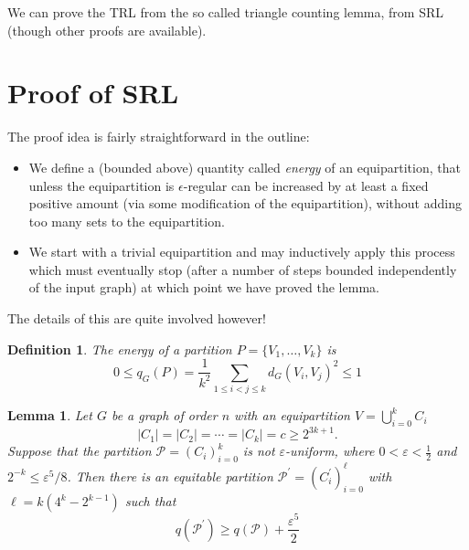 \documentclass[oneside,12pt,]{article}
\newtheorem{lemma}[theorem]{Lemma}
\newtheorem{definition}[theorem]{Definition}
\begin{document}

We can prove the TRL from the so called triangle counting lemma, from SRL (though other proofs are available).

\section{Proof of SRL}
The proof idea is fairly straightforward in the outline:

\begin{itemize}
    \item We define a (bounded above) quantity called \emph{energy} of an equipartition, that unless the equipartition is $\epsilon $-regular can be increased by at least a fixed positive amount (via some modification of the equipartition), without adding too many sets to the equipartition.

    \item We start with a trivial equipartition and may inductively apply this process which must eventually stop (after a number of steps bounded independently of the input graph) at which point we have proved the lemma.
\end{itemize}


The details of this are quite involved however!

\begin{definition}
    The \emph{energy} of a partition $P= \{V_1, \ldots, V_k\}$ is
    $$0 \le q_G(P)=\frac{1}{k^2} \sum_{1 \leq i<j \leq k} d_G\left(V_i, V_j\right)^2 \le  1$$
\end{definition}

\begin{lemma}
    Let $G$ be a graph of order $n$ with an equipartition $V=\bigcup_{i=0}^k C_i$
    $$
    \left|C_1\right|=\left|C_2\right|=\cdots=\left|C_k\right|=c \geq 2^{3 k+1} .
    $$
    Suppose that the partition $\mathcal{P}=\left(C_i\right)_{i=0}^k$ is not $\varepsilon$-uniform, where $0<\varepsilon<\frac{1}{2}$ and $2^{-k} \leq \varepsilon^5 / 8$. Then there is an equitable partition $\mathcal{P}^{\prime}=\left(C_i^{\prime}\right)_{i=0}^{\ell}$ with $\ell = k (4^k - 2^{k-1})$ such that
    $$
    q\left(\mathcal{P}^{\prime}\right) \geq q(\mathcal{P})+\frac{\varepsilon^5}{2}
    $$
\end{lemma}
\end{document}
